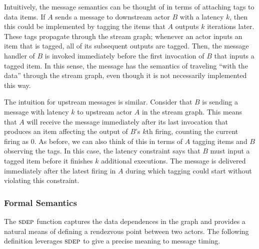 Intuitively, the message semantics can be thought of in terms of
attaching tags to data items.  If $A$ sends a message to downstream
actor $B$ with a latency $k$, then this could be implemented by
tagging the items that $A$ outputs $k$ iterations later.  These tags
propagate through the stream graph; whenever an actor inputs an item
that is tagged, all of its subsequent outputs are tagged.  Then, the
message handler of $B$ is invoked immediately before the first
invocation of $B$ that inputs a tagged item.  In this sense, the
message has the semantics of traveling ``with the data'' through the
stream graph, even though it is not necessarily implemented this way.

The intuition for upstream messages is similar.  Consider that $B$ is
sending a message with latency $k$ to upstream actor $A$ in the stream
graph.  This means that $A$ will receive the message immediately
after its last invocation that produces an item affecting the output
of $B$'s $k$th firing, counting the current firing as 0.  As before,
we can also think of this in terms of $A$ tagging items and $B$
observing the tags.  In this case, the latency constraint says that
$B$ must input a tagged item before it finishes $k$ additional
executions.  The message is delivered immediately after the latest
firing in $A$ during which tagging could start without violating this
constraint.

\subsubsection*{Formal Semantics}

The $\textsc{sdep}$ function captures the data dependences in the graph and
provides a natural means of defining a rendezvous point between two
actors.  The following definition leverages $\textsc{sdep}$ to give a precise
meaning to message timing.

